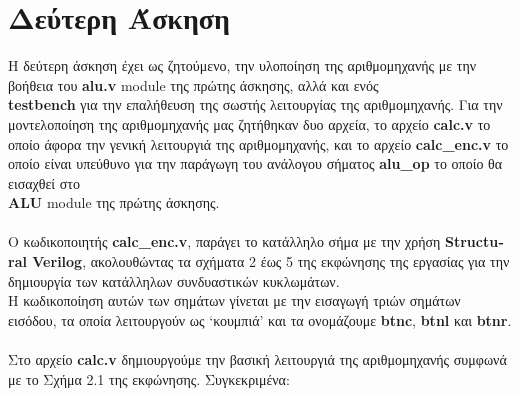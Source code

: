 \documentclass[a4paper,12pt]{report}
\def\tl{\textlatin}
\begin{document}
\chapter{Δεύτερη Άσκηση}
    \large Η δεύτερη άσκηση έχει ως ζητούμενο, την υλοποίηση της αριθμομηχανής με την βοήθεια του \textbf{\tl{alu.v}} \tl{module} της πρώτης άσκησης, αλλά και ενός \\\textbf{\tl{testbench}} για την επαλήθευση της σωστής λειτουργίας της αριθμομηχανής. Για την μοντελοποίηση της αριθμομηχανής μας ζητήθηκαν δυο αρχεία, το αρχείο \textbf{\tl{calc.v}} το οποίο άφορα την γενική λειτουργιά της αριθμομηχανής, και το αρχείο \textbf{\tl{calc\_enc.v}} το οποίο είναι υπεύθυνο για την παράγωγη του ανάλογου σήματος \textbf{\tl{alu\_op}} το οποίο θα εισαχθεί στο \\\textbf{\tl{ALU}} \tl{module} της πρώτης άσκησης. \\ \\
    Ο κωδικοποιητής \textbf{\tl{calc\_enc.v}}, παράγει το κατάλληλο σήμα με την χρήση \textbf{\tl{Structural Verilog}}, ακολουθώντας τα σχήματα 2 έως 5 της εκφώνησης της εργασίας για την δημιουργία των κατάλληλων συνδυαστικών κυκλωμάτων. \\Η κωδικοποίηση αυτών των σημάτων γίνεται με την εισαγωγή τριών σημάτων εισόδου, τα οποία λειτουργούν ως ‘κουμπιά’ και τα ονομάζουμε \textbf{\tl{btnc}}, \textbf{\tl{btnl}} και \textbf{\tl{btnr}}. \\ \\
    Στο αρχείο \textbf{\tl{calc.v}} δημιουργούμε την βασική λειτουργιά της αριθμομηχανής συμφωνά με το Σχήμα 2.1 της εκφώνησης. Συγκεκριμένα:
\end{document}
